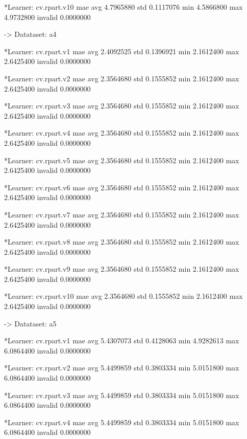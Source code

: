 \documentclass{article}
\begin{document}
\begin{Schunk}
\begin{Soutput}
	*Learner: cv.rpart.v10 
              mae
avg     4.7965880
std     0.1117076
min     4.5866800
max     4.9732800
invalid 0.0000000


-> Datataset:  a4 

	*Learner: cv.rpart.v1 
              mae
avg     2.4092525
std     0.1396921
min     2.1612400
max     2.6425400
invalid 0.0000000

	*Learner: cv.rpart.v2 
              mae
avg     2.3564680
std     0.1555852
min     2.1612400
max     2.6425400
invalid 0.0000000

	*Learner: cv.rpart.v3 
              mae
avg     2.3564680
std     0.1555852
min     2.1612400
max     2.6425400
invalid 0.0000000

	*Learner: cv.rpart.v4 
              mae
avg     2.3564680
std     0.1555852
min     2.1612400
max     2.6425400
invalid 0.0000000

	*Learner: cv.rpart.v5 
              mae
avg     2.3564680
std     0.1555852
min     2.1612400
max     2.6425400
invalid 0.0000000

	*Learner: cv.rpart.v6 
              mae
avg     2.3564680
std     0.1555852
min     2.1612400
max     2.6425400
invalid 0.0000000

	*Learner: cv.rpart.v7 
              mae
avg     2.3564680
std     0.1555852
min     2.1612400
max     2.6425400
invalid 0.0000000

	*Learner: cv.rpart.v8 
              mae
avg     2.3564680
std     0.1555852
min     2.1612400
max     2.6425400
invalid 0.0000000

	*Learner: cv.rpart.v9 
              mae
avg     2.3564680
std     0.1555852
min     2.1612400
max     2.6425400
invalid 0.0000000

	*Learner: cv.rpart.v10 
              mae
avg     2.3564680
std     0.1555852
min     2.1612400
max     2.6425400
invalid 0.0000000


-> Datataset:  a5 

	*Learner: cv.rpart.v1 
              mae
avg     5.4307073
std     0.4128063
min     4.9282613
max     6.0864400
invalid 0.0000000

	*Learner: cv.rpart.v2 
              mae
avg     5.4499859
std     0.3803334
min     5.0151800
max     6.0864400
invalid 0.0000000

	*Learner: cv.rpart.v3 
              mae
avg     5.4499859
std     0.3803334
min     5.0151800
max     6.0864400
invalid 0.0000000

	*Learner: cv.rpart.v4 
              mae
avg     5.4499859
std     0.3803334
min     5.0151800
max     6.0864400
invalid 0.0000000


\end{Soutput}
\end{Schunk}
\end{document}
